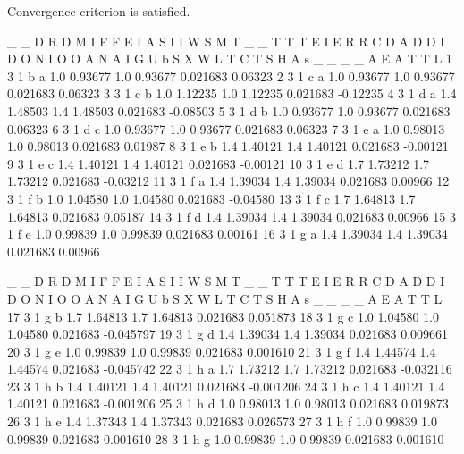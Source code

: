 \documentclass{article}
\begin{document}
\begin{Woutput}
Convergence criterion is satisfied.

    _  _                D                                 R
    D  M                I      F      F                   E
    I  A                S      I      I         W         S
    M  T  _  _          T      T      T         E         I
    E  R  R  C   D      A      D      D         I         D
 O  N  I  O  O   A      N      A      I         G         U
 b  S  X  W  L   T      C      T      S         H         A
 s  _  _  _  _   A      E      A      T         T         L
 1  3  1  b  a  1.0  0.93677  1.0  0.93677  0.021683   0.06323
 2  3  1  c  a  1.0  0.93677  1.0  0.93677  0.021683   0.06323
 3  3  1  c  b  1.0  1.12235  1.0  1.12235  0.021683  -0.12235
 4  3  1  d  a  1.4  1.48503  1.4  1.48503  0.021683  -0.08503
 5  3  1  d  b  1.0  0.93677  1.0  0.93677  0.021683   0.06323
 6  3  1  d  c  1.0  0.93677  1.0  0.93677  0.021683   0.06323
 7  3  1  e  a  1.0  0.98013  1.0  0.98013  0.021683   0.01987
 8  3  1  e  b  1.4  1.40121  1.4  1.40121  0.021683  -0.00121
 9  3  1  e  c  1.4  1.40121  1.4  1.40121  0.021683  -0.00121
10  3  1  e  d  1.7  1.73212  1.7  1.73212  0.021683  -0.03212
11  3  1  f  a  1.4  1.39034  1.4  1.39034  0.021683   0.00966
12  3  1  f  b  1.0  1.04580  1.0  1.04580  0.021683  -0.04580
13  3  1  f  c  1.7  1.64813  1.7  1.64813  0.021683   0.05187
14  3  1  f  d  1.4  1.39034  1.4  1.39034  0.021683   0.00966
15  3  1  f  e  1.0  0.99839  1.0  0.99839  0.021683   0.00161
16  3  1  g  a  1.4  1.39034  1.4  1.39034  0.021683   0.00966

    _  _                D                                 R
    D  M                I      F      F                   E
    I  A                S      I      I         W         S
    M  T  _  _          T      T      T         E         I
    E  R  R  C   D      A      D      D         I         D
 O  N  I  O  O   A      N      A      I         G         U
 b  S  X  W  L   T      C      T      S         H         A
 s  _  _  _  _   A      E      A      T         T         L
17  3  1  g  b  1.7  1.64813  1.7  1.64813  0.021683   0.051873
18  3  1  g  c  1.0  1.04580  1.0  1.04580  0.021683  -0.045797
19  3  1  g  d  1.4  1.39034  1.4  1.39034  0.021683   0.009661
20  3  1  g  e  1.0  0.99839  1.0  0.99839  0.021683   0.001610
21  3  1  g  f  1.4  1.44574  1.4  1.44574  0.021683  -0.045742
22  3  1  h  a  1.7  1.73212  1.7  1.73212  0.021683  -0.032116
23  3  1  h  b  1.4  1.40121  1.4  1.40121  0.021683  -0.001206
24  3  1  h  c  1.4  1.40121  1.4  1.40121  0.021683  -0.001206
25  3  1  h  d  1.0  0.98013  1.0  0.98013  0.021683   0.019873
26  3  1  h  e  1.4  1.37343  1.4  1.37343  0.021683   0.026573
27  3  1  h  f  1.0  0.99839  1.0  0.99839  0.021683   0.001610
28  3  1  h  g  1.0  0.99839  1.0  0.99839  0.021683   0.001610
\end{Woutput}
\end{document}

